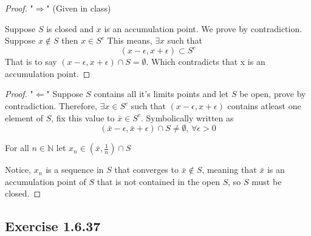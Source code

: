 \documentclass{tufte-book}
\theoremstyle{mytheoremstyle}
\theoremstyle{mylemstyle}
\theoremstyle{mydefstyle}
\begin{document}
\begin{proof}"$\Rightarrow$" (Given in class)

Suppose $S$ is closed and $x$ is an accumulation point.  We prove by contradiction.  Suppose $x \notin S$ then $x \in S^c$  This means, $\exists x$ such that
\[(x - \epsilon, x+\epsilon) \subset S^c \]
That is to say $(x-\epsilon, x+\epsilon) \cap S = \emptyset$.  Which contradicts that x is an accumulation point.
\end{proof}

\begin{proof}"$\Leftarrow$"
Suppose $S$ contains all it's limits points and let $S$ be open, prove by contradiction.  Therefore, $\exists x \in S^c$ such that $(x- \epsilon, x+\epsilon)$ contains atleast one element of $S$, fix this value to $\bar{x} \in S^c$.  Symbolically written as
\[(\bar{x}- \epsilon, \bar{x}+\epsilon) \cap S \neq \emptyset \text{,  } \forall \epsilon > 0\]

For all $n \in \mathbb{N}$ let $x_n \in (\bar{x}, \frac{1}{n}) \cap S$ 

Notice, ${x_n}$ is a sequence in $S$ that converges to $\bar{x} \notin S$, meaning that $\bar{x}$ is an accumulation point of $S$ that is not contained in the open $S$, so $S$ must be closed.
\end{proof}

\subsection{Exercise 1.6.37}
\end{document}
